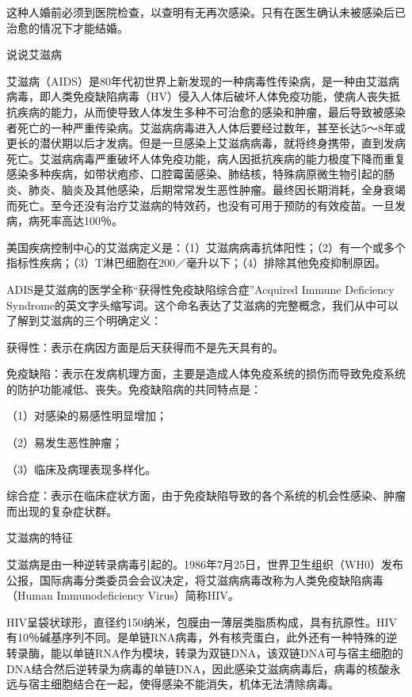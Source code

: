 \documentclass[12pt,UTF8]{ctexbook}
\begin{document}
这种人婚前必须到医院检查，以查明有无再次感染。只有在医生确认未被感染后已治愈的情况下才能结婚。





说说艾滋病


艾滋病（AIDS）是80年代初世界上新发现的一种病毒性传染病，是一种由艾滋病病毒，即人类免疫缺陷病毒（HV）侵入人体后破坏人体免疫功能，使病人丧失抵抗疾病的能力，从而使导致人体发生多种不可治愈的感染和肿瘤，最后导致被感染者死亡的一种严重传染病。艾滋病病毒进入人体后要经过数年，甚至长达5～8年或更长的潜伏期以后才发病。但是一旦感染上艾滋病病毒，就将终身携带，直到发病死亡。艾滋病病毒严重破坏人体免疫功能，病人因抵抗疾病的能力极度下降而重复感染多种疾病，如带状疱疹、口腔霉菌感染、肺结核，特殊病原微生物引起的肠炎、肺炎、脑炎及其他感染，后期常常发生恶性肿瘤。最终因长期消耗，全身衰竭而死亡。至今还没有治疗艾滋病的特效药，也没有可用于预防的有效疫苗。一旦发病，病死率高达100％。

美国疾病控制中心的艾滋病定义是：（1）艾滋病病毒抗体阳性；（2）有一个或多个指标性疾病；（3）T淋巴细胞在200／毫升以下；（4）排除其他免疫抑制原因。

ADIS是艾滋病的医学全称“获得性免疫缺陷综合症”Acquired Immune Deficiency Syndrome的英文字头缩写词。这个命名表达了艾滋病的完整概念，我们从中可以了解到艾滋病的三个明确定义：

获得性：表示在病因方面是后天获得而不是先天具有的。

免疫缺陷：表示在发病机理方面，主要是造成人体免疫系统的损伤而导致免疫系统的防护功能减低、丧失。免疫缺陷病的共同特点是：

（1）对感染的易感性明显增加；

（2）易发生恶性肿瘤；

（3）临床及病理表现多样化。

综合症：表示在临床症状方面，由于免疫缺陷导致的各个系统的机会性感染、肿瘤而出现的复杂症状群。





艾滋病的特征


艾滋病是由一种逆转录病毒引起的。1986年7月25日，世界卫生组织（WH0）发布公报，国际病毒分类委员会会议决定，将艾滋病病毒改称为人类免疫缺陷病毒（Human Immunodeficiency Virus）简称HIV。

HIV呈袋状球形，直径约150纳米，包膜由一薄层类脂质构成，具有抗原性。HIV有10％碱基序列不同。是单链RNA病毒，外有核壳蛋白，此外还有一种特殊的逆转录酶，能以单链RNA作为模块，转录为双链DNA，该双链DNA可与宿主细胞的DNA结合然后逆转录为病毒的单链DNA，因此感染艾滋病病毒后，病毒的核酸永远与宿主细胞结合在一起，使得感染不能消失，机体无法清除病毒。
\end{document}
